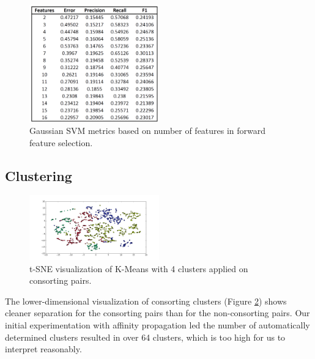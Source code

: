 \documentclass[twoside,twocolumn,paper=letter,fontsize=11pt]{article}
\begin{document}
\begin{figure}
      \centering
          \includegraphics[width=0.5\textwidth]{../figs/ClassificationMetrics_RbfSVM.png}
  \caption{Gaussian SVM metrics based on number of features in forward feature selection.}
  \label{fig:rbf_svm_vis}
\end{figure}


\subsection{Clustering}
\begin{figure}[h]
      \centering
          \includegraphics[width=0.5\textwidth]{../figs/consort_kmeans_2d_tsne.png}
  \caption{t-SNE visualization of K-Means with 4 clusters applied on consorting
  pairs.}
  \label{fig:consort_clustering_vis}
\end{figure}

The lower-dimensional visualization of consorting clusters  (Figure
\ref{fig:consort_clustering_vis}) shows cleaner separation for the consorting
pairs than for the non-consorting pairs. Our initial experimentation with
affinity propagation led the number of automatically determined clusters
resulted in over 64 clusters, which is too high for us to interpret reasonably.
\end{document}
